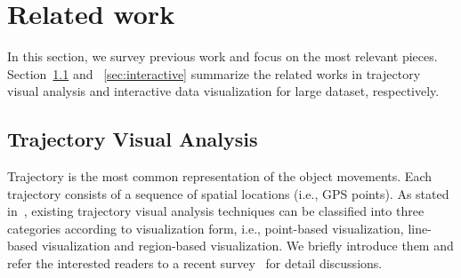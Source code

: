\section{Related work}\label{sec:rel}
In this section, we survey previous work and focus on the most relevant pieces.
Section~\ref{sec:trajvisana} and ~\ref{sec:interactive} summarize the related works in trajectory visual analysis and interactive data visualization for large dataset, respectively.

\subsection{Trajectory Visual Analysis}\label{sec:trajvisana}
Trajectory is the most common representation of the object movements.
Each trajectory consists of a sequence of spatial locations (i.e., GPS points).
As stated in~\cite{chen2015survey}, existing trajectory visual analysis techniques can be classified into three categories according to visualization form,
i.e., point-based visualization, line-based visualization and region-based visualization.
We briefly introduce them and refer the interested readers to a recent survey~\cite{chen2015survey} for detail discussions.

